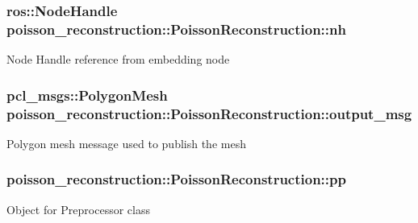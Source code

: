 \subsubsection[{\texorpdfstring{nh}{nh}}]{\setlength{\rightskip}{0pt plus 5cm}ros\+::\+Node\+Handle poisson\+\_\+reconstruction\+::\+Poisson\+Reconstruction\+::nh\hspace{0.3cm}{\ttfamily [private]}}\hypertarget{classpoisson__reconstruction_1_1_poisson_reconstruction_ac18f4bd8c54335edb4c9154eed871ba5}{}\label{classpoisson__reconstruction_1_1_poisson_reconstruction_ac18f4bd8c54335edb4c9154eed871ba5}
Node Handle reference from embedding node 
\subsubsection[{\texorpdfstring{output\+\_\+msg}{output_msg}}]{\setlength{\rightskip}{0pt plus 5cm}pcl\+\_\+msgs\+::\+Polygon\+Mesh poisson\+\_\+reconstruction\+::\+Poisson\+Reconstruction\+::output\+\_\+msg\hspace{0.3cm}{\ttfamily [private]}}\hypertarget{classpoisson__reconstruction_1_1_poisson_reconstruction_a10b2bb1e30658337e0780210acda450c}{}\label{classpoisson__reconstruction_1_1_poisson_reconstruction_a10b2bb1e30658337e0780210acda450c}
Polygon mesh message used to publish the mesh 
\subsubsection[{\texorpdfstring{pp}{pp}}]{ poisson\+\_\+reconstruction\+::\+Poisson\+Reconstruction\+::pp\hspace{0.3cm}{\ttfamily [private]}}\hypertarget{classpoisson__reconstruction_1_1_poisson_reconstruction_a9229da88237b26a663a94c1aca3ceb52}{}\label{classpoisson__reconstruction_1_1_poisson_reconstruction_a9229da88237b26a663a94c1aca3ceb52}
Object for Preprocessor class 
